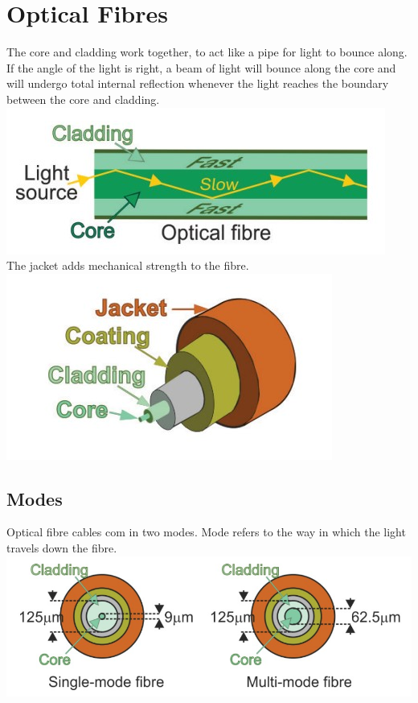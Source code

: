 \documentclass[a4paper,11pt, twocolumn]{article}
\begin{document}
\section{Optical Fibres}
The core and cladding work together, to act like a pipe for light to bounce along. If the angle of the light is right, a beam of light will bounce along the core and will undergo total internal reflection whenever the light reaches the boundary between the core and cladding. \\
\includegraphics[width=\linewidth]{coreCladding.jpg}\\
The jacket adds mechanical strength to the fibre.
\includegraphics[width=\linewidth]{opticalFibre.jpg}
\subsection{Modes}
Optical fibre cables com in two modes. Mode refers to the way in which the light travels down the fibre.\\
\includegraphics[width=\linewidth]{modes.jpg}
\end{document}
